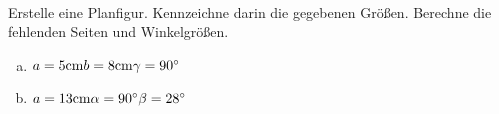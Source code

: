 \begin{aufgabe} ~ \\ 
Erstelle eine Planfigur. Kennzeichne darin die gegebenen Größen. Berechne die fehlenden Seiten und Winkelgrößen.\begin{enumerate}[a)] 
\item 
$a=5 \mathrm{cm} \\b=8 \mathrm{cm} \\\gamma=90^{\circ} \\$
\item 
$a=13 \mathrm{cm} \\\alpha=90^{\circ} \\\beta=28^{\circ} \\$
\end{enumerate} 
\end{aufgabe} 
